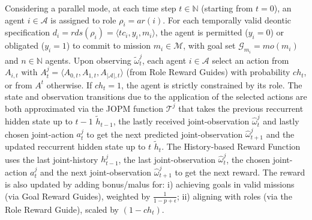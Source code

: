 \noindent Considering a parallel mode, at each time step $t \in \mathbb{N}$ (starting from $t=0$), an agent $i \in \mathcal{A}$ is assigned to role $\rho_i = ar(i)$. For each temporally valid deontic specification $d_i = rds(\rho_i) = \langle tc_i, y_i, m_i \rangle$, the agent is permitted ($y_i = 0$) or obligated ($y_i = 1$) to commit to mission $m_i \in \mathcal{M}$, with goal set $\mathcal{G}_{m_i} = mo(m_i)$ and $n \in \mathbb{N}$ agents.
%
Upon observing $\tilde{\omega}^j_t$, each agent $i \in \mathcal{A}$ select an action from $A_{i,t} \text{ with } A^j_t = \langle A_{0,t}, A_{1,t}, A_{|\mathcal{A}|,t}\rangle$ (from Role Reward Guides) with probability $ch_t$, or from $A^t$ otherwise. If $ch_t = 1$, the agent is strictly constrained by its role.
%
The state and observation transitions due to the application of the selected actions are both approximated via the JOPM function $\mathcal{T}^j$ that takes the previous reccurrent hidden state up to $t-1$ $\tilde{h}_{t-1}$, the lastly received joint-observation $\hat{\omega}_t^j$ and lastly chosen joint-action $a_t^j$ to get the next predicted joint-observation $\hat{\omega}_{t+1}^j$ and the updated reccurrent hidden state up to $t$ $\tilde{h}_t$. The History-based Reward Function uses the last joint-history $h^j_{t-1}$, the last joint-observation $\hat{\omega}_t^j$, the chosen joint-action $a_t^j$ and the next joint-observation $\hat{\omega}^j_{t+1}$ to get the next reward. The reward is also updated by adding bonus/malus for:
i) achieving goals in valid missions (via Goal Reward Guides), weighted by $\frac{1}{1 - p + \epsilon}$;
ii) aligning with roles (via the Role Reward Guide), scaled by $(1-ch_t)$.

